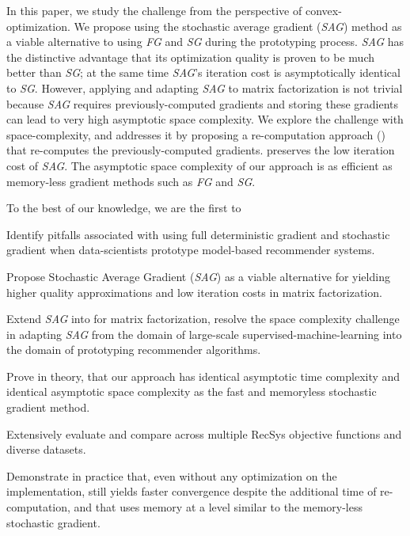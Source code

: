 In this paper, we study the challenge from the perspective of convex-optimization.  
We propose using the stochastic average gradient (\emph{SAG}) method \cite{schmidt2013minimizing, roux2012stochastic} as a viable alternative to using \emph{FG} and \emph{SG} during the prototyping process.  
\emph{SAG} has the distinctive advantage that its optimization quality is proven to be much better than \emph{SG}; at the same time \emph{SAG}'s iteration cost is asymptotically identical to \emph{SG}.  
However, applying and adapting \emph{SAG} to matrix factorization is not trivial because \emph{SAG} requires previously-computed gradients and storing these gradients can lead to very high asymptotic space complexity.  
We explore the challenge with space-complexity, and addresses it by proposing a re-computation approach (\tool) that re-computes the previously-computed gradients.  
\tool preserves the low iteration cost of \emph{SAG}.  
The asymptotic space complexity of our \tool approach is as efficient as memory-less gradient methods such as \emph{FG} and \emph{SG}.  

To the best of our knowledge, we are the first to
\begin{sloppy}
\begin{compactitem}
\item Identify pitfalls associated with using full deterministic gradient and stochastic gradient when data-scientists prototype model-based recommender systems.  
\item Propose Stochastic Average Gradient (\emph{SAG}) as a viable alternative for yielding higher quality approximations and low iteration costs in matrix factorization.  
\item Extend \emph{SAG} into \tool for matrix factorization, resolve the space complexity challenge in adapting \emph{SAG} from the domain of large-scale supervised-machine-learning into the domain of prototyping recommender algorithms.  
\item Prove in theory, that our \tool approach has identical asymptotic time complexity and identical asymptotic space complexity as the fast and memoryless stochastic gradient method.  
\item Extensively evaluate and compare \tool across multiple RecSys objective functions and diverse datasets.  
\item Demonstrate in practice that, even without any optimization on the implementation, \tool still yields faster convergence despite the additional time of re-computation, and that \tool uses memory at a level similar to the memory-less stochastic gradient.  
\end {compactitem}
\end{sloppy}
